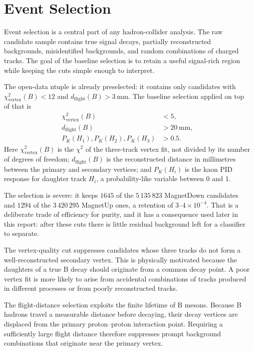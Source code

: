 \section{Event Selection}
\label{sec:selection_effect}

Event selection is a central part of any hadron-collider analysis. The raw candidate sample contains true signal decays, partially reconstructed backgrounds, misidentified backgrounds, and random combinations of charged tracks. The goal of the baseline selection is to retain a useful signal-rich region while keeping the cuts simple enough to interpret.

The open-data ntuple is already preselected: it contains only candidates with
$\chi^2_{\mathrm{vertex}}(B) < 12$ and $d_{\mathrm{flight}}(B) > 3~\mathrm{mm}$.
The baseline selection applied on top of that is
\begin{align}
  \chi^2_{\mathrm{vertex}}(B) &< 5, \\
  d_{\mathrm{flight}}(B) &> 20~\mathrm{mm}, \\
  P_K(H_1), P_K(H_2), P_K(H_3) &> 0.5 .
\end{align}
Here $\chi^2_{\mathrm{vertex}}(B)$ is the $\chi^2$ of the three-track vertex fit,
not divided by its number of degrees of freedom; $d_{\mathrm{flight}}(B)$ is the
reconstructed distance in millimetres between the primary and secondary vertices;
and $P_K(H_i)$ is the kaon PID response for daughter track $H_i$, a
probability-like variable between 0 and 1.

The selection is severe: it keeps $1645$ of the $5\,135\,823$ MagnetDown
candidates and $1294$ of the $3\,420\,295$ MagnetUp ones, a retention of
$3$--$4\times10^{-4}$. That is a deliberate trade of efficiency
for purity, and it has a consequence used later in this report: after these cuts
there is little residual background left for a classifier to separate.

The vertex-quality cut suppresses candidates whose three tracks do not form a well-reconstructed secondary vertex. This is physically motivated because the daughters of a true B decay should originate from a common decay point. A poor vertex fit is more likely to arise from accidental combinations of tracks produced in different processes or from poorly reconstructed tracks.

The flight-distance selection exploits the finite lifetime of B mesons. Because B hadrons travel a measurable distance before decaying, their decay vertices are displaced from the primary proton--proton interaction point. Requiring a sufficiently large flight distance therefore suppresses prompt background combinations that originate near the primary vertex.

